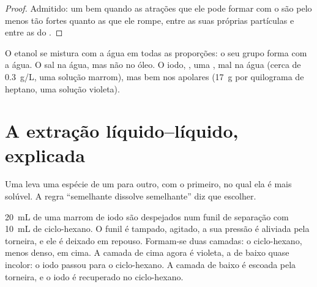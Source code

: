 \begin{proof}
Admitido: um   bem quando as atrações que ele pode
formar com o  são pelo menos tão fortes quanto as que ele rompe,
entre as suas próprias partículas e entre as  do .
\end{proof}

\begin{example}\label{ex:g11:dissolution:cases}
O etanol se mistura com a água em todas as proporções: o seu grupo
 forma  com a água. O sal  na
água, mas não no óleo. O iodo, , uma , 
mal na água (cerca de \qty{0.3}{g/L}, uma solução marrom), mas bem nos
 apolares (\qty{17}{g} por quilograma de heptano, uma solução
violeta).
\end{example}

\section{A extração líquido--líquido, explicada}

Uma  leva uma espécie de um  para
outro,  com o primeiro, no qual ela é mais solúvel. A regra
``semelhante dissolve semelhante'' diz que  escolher.

\begin{inthelab}
\qty{20}{mL} de uma  marrom de iodo são despejados num
funil de separação com \qty{10}{mL} de ciclo-hexano. O funil é tampado,
agitado, a sua pressão é aliviada pela torneira, e ele é deixado em
repouso. Formam-se duas camadas: o ciclo-hexano, menos denso, em cima. A
camada de cima agora é violeta, a de baixo quase incolor: o iodo passou
para o ciclo-hexano. A camada de baixo é escoada pela torneira, e o iodo
é recuperado no ciclo-hexano.
\end{inthelab}

